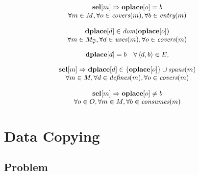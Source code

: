 \begin{equation}
  \begin{array}{c}
    \mVar{sel}[m] \mImp \mVar{oplace}[o] = b \\
    \forall m \in \mMatchSet,
    \forall o \in \mCovers(m),
    \forall b \in \mEntry(m)
  \end{array}
  \labelEquation{jump-placements}
\end{equation}

\begin{equation}
  \begin{array}{c}
    \mVar{dplace}[d] \in \mDom(\mVar{oplace}[o]) \\
    \forall m \in \mMatchCompSet{\mPhi},
    \forall d \in \mUses(m),
    \forall o \in \mCovers(m)
  \end{array}
  \labelEquation{dom}
\end{equation}

\begin{equation}
  \mVar{dplace}[d] = b
  \mQuantSep
  \forall \mUnDirEdge{d}{b} \in \mDefEdgeSet,
  \labelEquation{def-edges}
\end{equation}

\begin{equation}
  \begin{array}{c}
    \mVar{sel}[m]
    \mImp
    \mVar{dplace}[d] \in \mSet{\mVar{oplace}[o]} \cup \mSpans(m) \\
    \forall m \in \mMatchSet,
    \forall d \in \mDefines(m),
    \forall o \in \mCovers(m)
  \end{array}
  \labelEquation{spanning}
\end{equation}

\begin{equation}
  \begin{array}{c}
    \mVar{sel}[m]
    \mImp
    \mVar{oplace}[o] \neq b \\
    \forall o \in \mOpSet,
    \forall m \in \mMatchSet,
    \forall b \in \mConsumes(m)
  \end{array}
  \labelEquation{consumption}
\end{equation}



\section{Data Copying}
\subsection{Problem}
